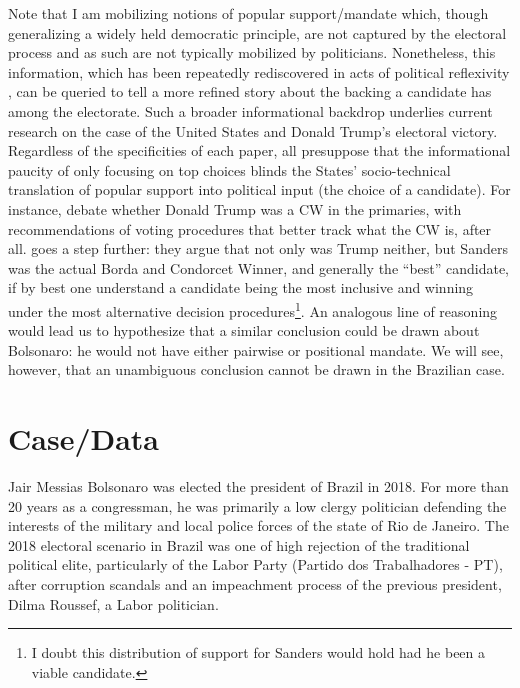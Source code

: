 \documentclass[hidelinks,11pt]{article}
\begin{document}
Note that I am mobilizing notions of popular support/mandate which, though
generalizing a widely held democratic principle, are not captured by the
electoral process and as such are not typically mobilized by politicians.
Nonetheless, this information, which has been repeatedly rediscovered in acts of
political reflexivity \parencite{mclean14_stran_histor_social_choic_contr}, can
be queried to tell a more refined story about the backing a candidate has among
the electorate. Such a broader informational backdrop underlies current research
on the case of the United States and Donald Trump's electoral victory.
Regardless of the specificities of each paper, all presuppose that the
informational paucity of only focusing on top choices blinds the States'
socio-technical translation of popular support into political input (the choice
of a candidate). For instance, \textcite{potthoff2021condorcet, woon2020trump,
kurrild2018trump} debate whether Donald Trump was a CW in the primaries, with
recommendations of voting procedures that better track what the CW is, after
all. \textcite{igersheim22_compar_votin_method} goes a step further: they argue
that not only was Trump neither, but Sanders was the actual Borda and Condorcet
Winner, and generally the ``best'' candidate, if by best one understand a
candidate being the most inclusive and winning under the most alternative
decision procedures\footnote{I doubt this distribution of support for Sanders
would hold had he been a viable candidate.}. An analogous line of reasoning
would lead us to hypothesize that a similar conclusion could be drawn about
Bolsonaro: he would not have either pairwise or positional mandate. We will see,
however, that an unambiguous conclusion cannot be drawn in the Brazilian case.

\section{Case/Data}

Jair Messias Bolsonaro was elected the president of Brazil in 2018. For more
than 20 years as a congressman, he was primarily a low clergy politician
defending the interests of the military and local police forces of the state of
Rio de Janeiro. The 2018 electoral scenario in Brazil was one of high rejection
of the traditional political elite, particularly of the Labor Party (Partido dos
Trabalhadores - PT), after corruption scandals and an impeachment process of the
previous president, Dilma Roussef, a Labor politician.
\end{document}

